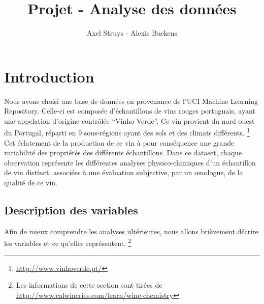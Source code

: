 \documentclass[11pt,a4paper]{article}
\author{Axel Struys - Alexis Buckens}
\title{Projet - Analyse des données}
\begin{document}
\maketitle

\section{Introduction}

Nous avons choisi une base de données en provenance de l'UCI Machine Learning Repository. Celle-ci est composée d'échantillons de vins rouges portuguais, ayant une appelation d'origine contrôlée ``Vinho Verde''. Ce vin provient du nord ouest du Portugal, réparti en 9 sous-régions ayant des sols et des climats différents. \footnote{\url{http://www.vinhoverde.pt/}} Cet éclatement de la production de ce vin à pour conséquence une grande variabilité des propriétés des différents échantillons. Dans ce dataset, chaque observation représente les différentes analyses physico-chimiques d'un échantillon de vin distinct, associées à une évaluation subjective, par un \oe nologue, de la qualité de ce vin.

\subsection{Description des variables}
Afin de mieux comprendre les analyses ultérieures, nous allons brièvement décrire les variables et ce qu'elles représentent. \footnote{Les informations de cette section sont tirées de  \url{http://www.calwineries.com/learn/wine-chemistry}}
\end{document}

